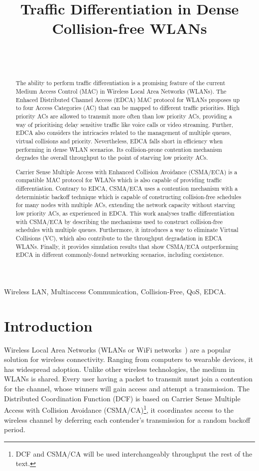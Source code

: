 \documentclass[a4paper]{article}
\title{Traffic Differentiation in Dense Collision-free WLANs}
\author{\IEEEauthorblockN{Luis Sanabria-Russo\IEEEauthorrefmark{0}, Boris Bellalta\IEEEauthorrefmark{0}}\\
      \IEEEauthorblockA{\IEEEauthorrefmark{0}Department of Information and Communication Technologies \\ Universitat Pompeu Fabra, Barcelona, Spain
      \\\ {\tt \{luis.sanabria,boris.bellalta\}@upf.edu}}\\
  }
\begin{document}
\maketitle

\begin{abstract}
The ability to perform traffic differentiation is a promising feature of the current Medium Access Control (MAC) in Wireless Local Area Networks (WLANs). The Enhaced Distributed Channel Access (EDCA) MAC protocol for WLANs proposes up to four Access Categories (AC) that can be mapped to different traffic priorities. High priority ACs are allowed to transmit more often than low priority ACs, providing a way of prioritising delay sensitive traffic like voice calls or video streaming. Further, EDCA also considers the intricacies related to the management of multiple queues, virtual collisions and priority. Nevertheless, EDCA falls short in efficiency when performing in dense WLAN scenarios. Its collision-prone contention mechanism degrades the overall throughput to the point of starving low priority ACs.

Carrier Sense Multiple Access with Enhanced Collision Avoidance (CSMA/ECA) is a compatible MAC protocol for WLANs which is also capable of providing traffic differentiation. Contrary to EDCA, CSMA/ECA uses a contention mechanism with a deterministic backoff technique which is capable of constructing collision-free schedules for many nodes with multiple ACs, extending the network capacity without starving low priority ACs, as experienced in EDCA. This work analyses traffic differentiation with CSMA/ECA by describing the mechanisms used to construct collision-free schedules with multiple queues. Furthermore, it introduces a way to eliminate Virtual Collisions (VC), which also contribute to the throughput degradation in EDCA WLANs. Finally, it provides simulation results that show CSMA/ECA outperforming EDCA in different commonly-found networking scenarios, including coexistence.
\end{abstract}

\begin{IEEEkeywords}
Wireless LAN, Multiaccess Communication, Collision-Free, QoS, EDCA.
\end{IEEEkeywords}

\section{Introduction}
Wireless Local Area Networks (WLANs or WiFi networks~\cite{802Standards}) are a popular solution for wireless connectivity. Ranging from computers to wearable devices, it has widespread adoption. Unlike other wireless technologies, the medium in WLANs is shared. Every user having a packet to transmit must join a contention for the channel, whose winners will gain access and attempt a transmission. The Distributed Coordination Function (DCF) is based on Carrier Sense Multiple Access with Collision Avoidance (CSMA/CA)\footnote{DCF and CSMA/CA will be used interchangeably throughput the rest of the text.}, it coordinates access to the wireless channel by deferring each contender's transmission for a random backoff period.
\end{document}
